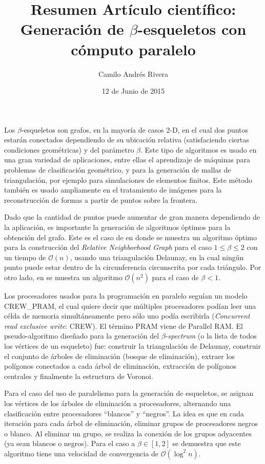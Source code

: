 \documentclass{article}
\title{Resumen Artículo científico: Generación de $\beta$-esqueletos con cómputo paralelo \cite{beta}}
\author{Camilo Andrés Rivera}
\date{12 de Junio de 2015}
\begin{document}
\maketitle

Los $\beta$-esqueletos son grafos, en la mayoría de casos 2-D, en el cual dos puntos estarán conectados dependiendo de su ubicación relativa (satisfaciendo ciertas condiciones geométricas) y del parámetro $\beta$. Este tipo de algoritmos es usado en una gran variedad de aplicaciones, entre ellas el aprendizaje de máquinas para problemas de clasificación geométrico, y para la generación de mallas de triangulación, por ejemplo para simulaciones de elementos finitos. Este método también es usado ampliamente en el tratamiento de imágenes para la reconstrucción de formas a partir de puntos sobre la frontera.

Dado que la cantidad de puntos puede aumentar de gran manera dependiendo de la aplicación, es importante la generación de algoritmos óptimos para la obtención del grafo. Este es el caso de \cite{unoados} en donde se muestra un algoritmo óptimo para la construcción del \textit{Relative Neighborhood Graph} para el caso $1\leq\beta\leq2$ con un tiempo de $\mathcal{O}(n)$, usando una triangulación Delaunay, en la cual ningún punto puede estar dentro de la circunferencia circunscrita por cada triángulo. Por otro lado, en \cite{menosdeuno}  se muestra un algoritmo $\mathcal{O}(n^2)$ para el caso de $\beta<1$.

Los procesadores usados para la programación en paralelo seguían un modelo CREW_PRAM, el cual quiere decir que múltiples procesadores podían leer una célda de memoria simultáneamente pero sólo uno podía escribirla (\textit{Concurrent read exclusive write}: CREW). El término PRAM viene de Parallel RAM. El pseudo-algoritmo diseñado para la generación del $\beta$-\textit{spectrum} (o la lista de todos los vértices de un esqueleto) fue: construir la triangulación de Delaunay, construir el conjunto de árboles de eliminación (bosque de eliminación), extraer los polígonos conectados a cada árbol de eliminación, extracción de polígonos centrales y finalmente la estructura de Voronoi.

Para el caso del uso de paralelismo para la generación de esqueletos, se asignan los vértices de los árboles de eliminación a procesadores, alternando una clasificación entre procesadores ``blancos'' y ``negros''. La idea es que en cada iteración para cada árbol de eliminación, eliminar grupos de procesadores negros o blanco. Al eliminar un grupo, se realiza la conexión de los grupos adyacentes (ya sean blancos o negros). Para el caso a $\beta\in[1,2]$ se demuestra que este algoritmo tiene una velocidad de convergencia de $\mathcal{O}(\log^2n)$.



\end{document}

